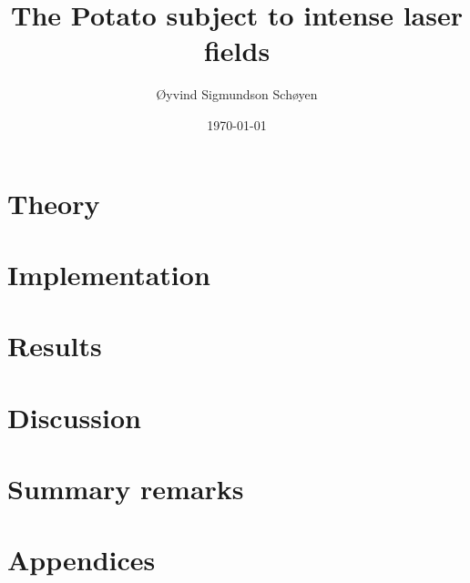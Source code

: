 \documentclass[twoside, english, notitlepage, 12pt]{uiofysmaster}
\author{Øyvind Sigmundson Schøyen}
\title{The Potato subject to intense laser fields}
\date{\today}
\begin{document}
\frontmatter
    \maketitle

    \begin{abstract}
        
    \end{abstract}

    \begin{acknowledgements}
        
    \end{acknowledgements}

    \tableofcontents
    \listoffigures
    \listoftables

\mainmatter

    

    \part{Theory}
        
        
        

        
        
        
        

    \part{Implementation}
    \part{Results}
    \part{Discussion}
    \part{Summary remarks}

    \part{Appendices}

\appendix
    
    
    
    
    
    


\printbibliography
\end{document}
